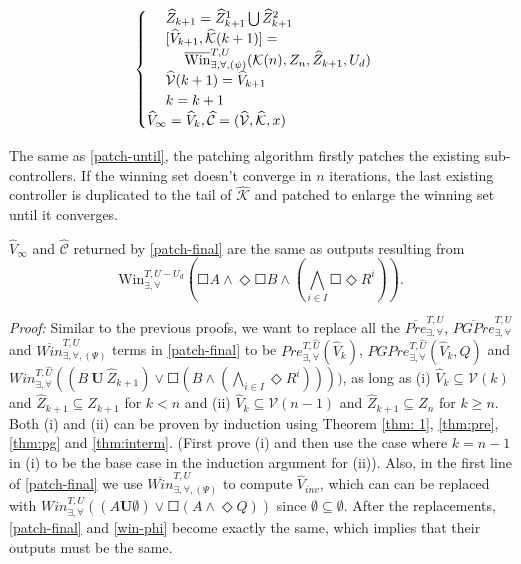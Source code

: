 {\begin{align}
\begin{cases}
\ \ \ \ \widehat{Z}_{k+1} = \widehat{Z}_{k+1}^1\bigcup\widehat{Z}_{k+1}^2  \\
\ \ \ \ [\widehat{V}_{k+1},\widehat{\mathcal{K}}(k+1)]=\\
\ \ \ \ \ \ \ \ \overline{\text{Win}}_{\exists,\forall,(\psi)}^{T, U}(\mathcal{K}(n),Z_{n},\widehat{Z}_{k+1},U_d)\\
\ \ \ \ \widehat{\mathcal{V}}(k+1)=\widehat{V}_{k+1}\\
\ \ \ \ {\color{black} k = k+1}\\
\widehat{V}_\infty = \widehat{V}_k, \widehat{\mathcal{C}} = (\widehat{\mathcal{V}},\widehat{\mathcal{K}},x) 
\end{cases}\label{patch-final}
\end{align}
}

The same as \eqref{patch-until}, the patching algorithm firstly patches the existing sub-controllers. If the winning set doesn't converge in $ n $ iterations, the last existing controller is duplicated to the tail of $ \widehat{\mathcal{K}} $ and patched to enlarge the winning set until it converges.

\begin{theorem}
	$ \widehat{V}_\infty $ and $ \widehat{\mathcal{C}} $ returned by \eqref{patch-final} are the same as outputs resulting from
\begin{displaymath}
	\text{Win}_{\exists, \forall}^{T,U-U_d}\left(\Square A \wedge \Diamond \Square B \wedge \left( \bigwedge_{i\in I} \Square \Diamond R^i\right)\right).
\end{displaymath} \label{thm:phi}
\end{theorem}
\emph{Proof:} Similar to the previous proofs, we want to replace all the $ \overline{Pre}^{T,U}_{\exists,\forall} $, $ \overline{PGPre}^{T,U}_{\exists,\forall} $ and $ \overline{Win}_{\exists,\forall, (\Psi)}^{T,U} $ terms in \eqref{patch-final} to be $ Pre^{T,\widehat{U}}_{\exists,\forall}(\widehat{V}_k) $, $PGPre^{T,\widehat{U}}_{\exists,\forall}(\widehat{V}_k, Q) $ and $ Win^{T,\widehat{U}}_{\exists,\forall}((B\ \mathbf{U}\ \widehat{Z}_{k+1})\vee\Square (B\wedge (\bigwedge_{i\in I}\Diamond R^i)))) $, as long as (i) $ \widehat{V}_{k} \subseteq \mathcal{V}(k) $ and $ \widehat{Z}_{k+1}\subseteq Z_{k+1} $ for $ k < n $ and (ii) $ \widehat{V}_k\subseteq \mathcal{V}(n-1) $ and $ \widehat{Z}_{k+1}\subseteq Z_n $ for $ k\geq n $. Both (i) and (ii) can be proven by induction using Theorem \ref{thm: 1}, \ref{thm:pre}, \ref{thm:pg} and \ref{thm:interm}. (First prove (i) and then use the case where $ k=n-1 $ in (i) to be the base case in the induction argument for (ii)). Also, in the first line of \eqref{patch-final} we use $ \overline{Win}_{\exists,\forall,(\Psi)}^{T,U} $ to compute $ \widehat{V}_{inv} $, which can can be replaced with $ Win_{\exists,\forall}^{T,U}((A\mathbf{U}\emptyset)\vee \Square(A\wedge \Diamond Q)) $ since $ \emptyset\subseteq \emptyset $. After the replacements, \eqref{patch-final} and \eqref{win-phi} become exactly the same, which implies that their outputs must be the same. \QEDB


